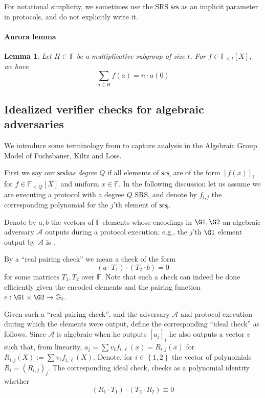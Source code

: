 \documentclass[11pt]{article} %
\newcommand{\Gt}{\ensuremath{{\mathbb G}_t}\xspace}
\newcommand{\F}{\ensuremath{\mathbb F}\xspace}
\newcommand{\adv}{\ensuremath{\mathcal A}\xspace}
\newcommand{\srs}{\ensuremath{\mathsf{srs}}\xspace}
\newcommand{\srsi}{\ensuremath{\mathsf{srs_i}}\xspace}
\newcommand{\defeq}{:=}
\newcommand{\enci}[1]{\ensuremath{\left[#1\right]_i}\xspace}
\newcommand{\set}[1]{\ensuremath{\left\{#1\right\}}\xspace}
\newcommand{\polysofdeg}[1]{\ensuremath{\F_{< #1}[X]}\xspace}
\newtheorem{lemma}{Lemma}[section]
\begin{document}
For notational simplicity, we sometimes use the SRS \srs as an implicit parameter in protocols, and do not explicitly write it.


\paragraph{Aurora lemma}
\begin{lemma}\label{lem:aurora}
 Let $H\subset \F$ be a multiplicative subgroup of size $t$.
 For $f\in\polysofdeg{t}$, we have 
\[\sum_{a\in H}f(a) = n\cdot a(0)\]
\end{lemma}



\subsection{Idealized verifier checks for algebraic adversaries}\label{subsec:agm}
We introduce some terminology from \cite{plonk} to capture analysis in the Algebraic Group Model of Fuchsbauer, Kiltz and Loss\cite{AGM}.

First we say our \srs \emph{has degree $Q$} if all elements of \srsi are of the form  \enci{f(x)} for $f\in \polysofdeg{Q}$ and uniform $x\in \F$. In the following discussion let us assume we are executing a protocol with a degree $Q$ SRS, and denote by $f_{i,j}$ the corresponding polynomial for the $j$'th element of \srsi.

Denote by $a,b$ the vectors of $\F$-elements whose encodings in $\G1,\G2$ an algebraic adversary \adv outputs during a protocol execution; e.g., the $j$'th $\G1$ element output by \adv is .

By a ``real pairing check'' we mean a check of the form
\[(a\cdot T_1) \cdot (T_2\cdot b)=0\]
for some matrices $T_1,T_2$ over $\F$.
Note that such a check can indeed be done efficiently given the encoded elements and the pairing function $e:\G1\times \G2\to \Gt$.



Given such a ``real pairing check'', and the adversary \adv and protocol execution during which the elements were output, define the corresponding ``ideal check'' as follows.
Since \adv is algebraic when he outputs \enci{a_j} he also outputs a vector $v$ such that, from linearity, $a_j = \sum v_\ell f_{i,\ell}(x)=R_{i,j}(x)$ for $R_{i,j}(X) \defeq \sum v_\ell f_{i,\ell}(X)$.
Denote, for $i\in \set{1,2}$ the vector of polynomials $R_i=(R_{i,j})_j$.
The corresponding ideal check, checks as a polynomial identity whether
\[(R_1 \cdot T_1)\cdot (T_2\cdot R_2) \equiv 0\]
\end{document}

